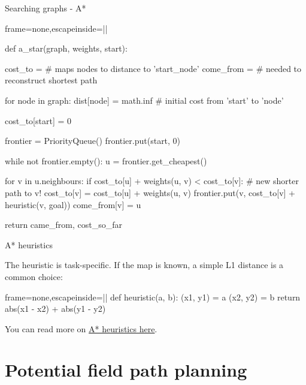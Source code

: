\documentclass[compress,xcolor=table]{beamer}
\begin{document}
\begin{frame}[fragile]{Searching graphs - A*}

\begin{pythoncode*}{frame=none,escapeinside=||}

def a_star(graph, weights, start):

  cost_to = {} # maps nodes to distance to 'start_node'
  come_from = {} # needed to reconstruct shortest path

  for node in graph:
    dist[node] = math.inf # initial cost from 'start' to 'node'

  cost_to[start] = 0

  frontier = PriorityQueue()
  frontier.put(start, 0)

  while not frontier.empty():
    u = frontier.get_cheapest()

    for v in u.neighbours:
      if cost_to[u] + weights(u, v) < cost_to[v]: # new shorter path to v!
        cost_to[v] = cost_to[u] + weights(u, v)
        frontier.put(v, cost_to[v] + heuristic(v, goal))
        come_from[v] = u

  return came_from, cost_so_far
\end{pythoncode*}
\end{frame}

\begin{frame}[fragile]{A* heuristics}

The heuristic is task-specific. If the map is known, a simple L1 distance
is a common choice:

\begin{pythoncode*}{frame=none,escapeinside=||}
def heuristic(a, b):
    (x1, y1) = a
    (x2, y2) = b
    return abs(x1 - x2) + abs(y1 - y2)
\end{pythoncode*}

    You can read more on
    \href{http://theory.stanford.edu/~amitp/GameProgramming/Heuristics.html}{A*
    heuristics here}.

\end{frame}



\section{Potential field path planning}
\end{document}
